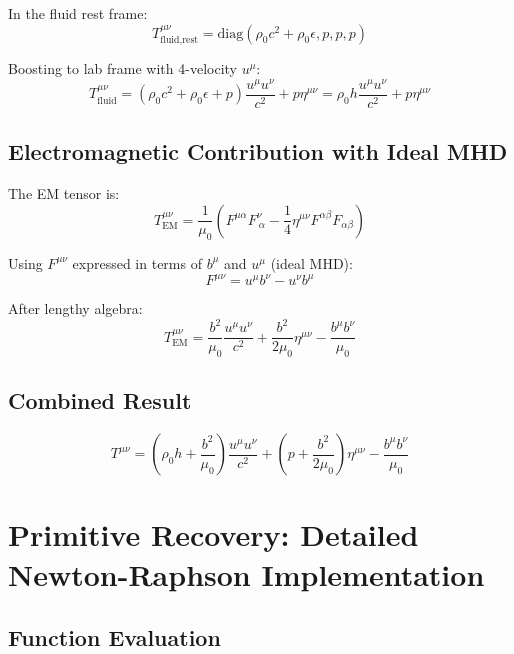 \documentclass[12pt,a4paper]{article}
\begin{document}
In the fluid rest frame:
\begin{equation}
T^{\mu\nu}_\text{fluid,rest} = \text{diag}(\rho_0 c^2 + \rho_0 \epsilon, p, p, p)
\end{equation}

Boosting to lab frame with 4-velocity $u^\mu$:
\begin{equation}
T^{\mu\nu}_\text{fluid} = (\rho_0 c^2 + \rho_0 \epsilon + p)\frac{u^\mu u^\nu}{c^2} + p \eta^{\mu\nu}
= \rho_0 h \frac{u^\mu u^\nu}{c^2} + p \eta^{\mu\nu}
\end{equation}

\subsection{Electromagnetic Contribution with Ideal MHD}

The EM tensor is:
\begin{equation}
T^{\mu\nu}_\text{EM} = \frac{1}{\mu_0}\left(F^{\mu\alpha}F^\nu_{\ \alpha}
- \frac{1}{4}\eta^{\mu\nu}F^{\alpha\beta}F_{\alpha\beta}\right)
\end{equation}

Using $F^{\mu\nu}$ expressed in terms of $b^\mu$ and $u^\mu$ (ideal MHD):
\begin{equation}
F^{\mu\nu} = u^\mu b^\nu - u^\nu b^\mu
\end{equation}

After lengthy algebra:
\begin{equation}
T^{\mu\nu}_\text{EM} = \frac{b^2}{\mu_0}\frac{u^\mu u^\nu}{c^2} + \frac{b^2}{2\mu_0}\eta^{\mu\nu}
- \frac{b^\mu b^\nu}{\mu_0}
\end{equation}

\subsection{Combined Result}

\begin{equation}
T^{\mu\nu} = \left(\rho_0 h + \frac{b^2}{\mu_0}\right)\frac{u^\mu u^\nu}{c^2}
+ \left(p + \frac{b^2}{2\mu_0}\right)\eta^{\mu\nu}
- \frac{b^\mu b^\nu}{\mu_0}
\end{equation}

\section{Primitive Recovery: Detailed Newton-Raphson Implementation}
\label{app:newton}

\subsection{Function Evaluation}
\end{document}
